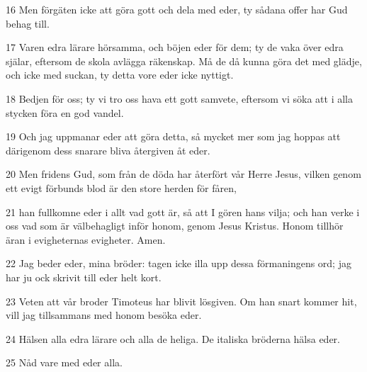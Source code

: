 \par 16 Men förgäten icke att göra gott och dela med eder, ty sådana offer har Gud behag till.
\par 17 Varen edra lärare hörsamma, och böjen eder för dem; ty de vaka över edra själar, eftersom de skola avlägga räkenskap. Må de då kunna göra det med glädje, och icke med suckan, ty detta vore eder icke nyttigt.
\par 18 Bedjen för oss; ty vi tro oss hava ett gott samvete, eftersom vi söka att i alla stycken föra en god vandel.
\par 19 Och jag uppmanar eder att göra detta, så mycket mer som jag hoppas att därigenom dess snarare bliva återgiven åt eder.
\par 20 Men fridens Gud, som från de döda har återfört vår Herre Jesus, vilken genom ett evigt förbunds blod är den store herden för fåren,
\par 21 han fullkomne eder i allt vad gott är, så att I gören hans vilja; och han verke i oss vad som är välbehagligt inför honom, genom Jesus Kristus. Honom tillhör äran i evigheternas evigheter. Amen.
\par 22 Jag beder eder, mina bröder: tagen icke illa upp dessa förmaningens ord; jag har ju ock skrivit till eder helt kort.
\par 23 Veten att vår broder Timoteus har blivit lösgiven. Om han snart kommer hit, vill jag tillsammans med honom besöka eder.
\par 24 Hälsen alla edra lärare och alla de heliga. De italiska bröderna hälsa eder.
\par 25 Nåd vare med eder alla.


